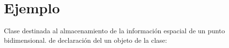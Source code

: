 \section{Ejemplo}
Clase destinada al almacenamiento de la información espacial de un punto bidimensional. de declaración del un objeto de la clase\-:


\begin{DoxyCodeInclude}
\end{DoxyCodeInclude}
 
